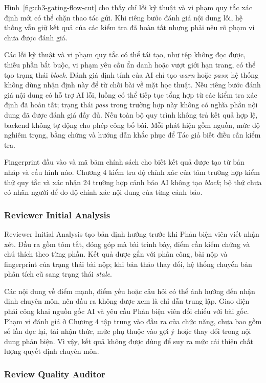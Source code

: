 Hình~\ref{fig:ch3-gating-flow-cut} cho thấy chỉ lỗi kỹ thuật và vi phạm quy tắc xác định mới có thể chặn thao tác gửi. Khi riêng bước đánh giá nội dung lỗi, hệ thống vẫn giữ kết quả của các kiểm tra đã hoàn tất nhưng phải nêu rõ phạm vi chưa được đánh giá.

Các lỗi kỹ thuật và vi phạm quy tắc có thể tái tạo, như tệp không đọc được, thiếu phần bắt buộc, vi phạm yêu cầu ẩn danh hoặc vượt giới hạn trang, có thể tạo trạng thái \textit{block}. Đánh giá định tính của AI chỉ tạo \textit{warn} hoặc \textit{pass}; hệ thống không dùng nhận định này để từ chối bài về mặt học thuật. Nếu riêng bước đánh giá nội dung có hỗ trợ AI lỗi, luồng có thể tiếp tục tổng hợp từ các kiểm tra xác định đã hoàn tất; trạng thái \textit{pass} trong trường hợp này không có nghĩa phần nội dung đã được đánh giá đầy đủ. Nếu toàn bộ quy trình không trả kết quả hợp lệ, backend không tự động cho phép công bố bài. Mỗi phát hiện gồm nguồn, mức độ nghiêm trọng, bằng chứng và hướng dẫn khắc phục để Tác giả biết điều cần kiểm tra.

Fingerprint đầu vào và mã băm chính sách cho biết kết quả được tạo từ bản nháp và cấu hình nào. Chương 4 kiểm tra độ chính xác của tám trường hợp kiểm thử quy tắc và xác nhận 24 trường hợp cảnh báo AI không tạo \textit{block}; bộ thử chưa có nhãn người để đo độ chính xác nội dung của từng cảnh báo.

\subsubsection{Reviewer Initial Analysis}

Reviewer Initial Analysis tạo bản định hướng trước khi Phản biện viên viết nhận xét. Đầu ra gồm tóm tắt, đóng góp mà bài trình bày, điểm cần kiểm chứng và chú thích theo từng phần. Kết quả được gắn với phân công, bài nộp và fingerprint của trạng thái bài nộp; khi bản thảo thay đổi, hệ thống chuyển bản phân tích cũ sang trạng thái \textit{stale}.

Các nội dung về điểm mạnh, điểm yếu hoặc câu hỏi có thể ảnh hưởng đến nhận định chuyên môn, nên đầu ra không được xem là chỉ dẫn trung lập. Giao diện phải công khai nguồn gốc AI và yêu cầu Phản biện viên đối chiếu với bài gốc. Phạm vi đánh giá ở Chương 4 tập trung vào đầu ra của chức năng, chưa bao gồm số lần đọc lại, tải nhận thức, mức phụ thuộc vào gợi ý hoặc thay đổi trong nội dung phản biện. Vì vậy, kết quả không được dùng để suy ra mức cải thiện chất lượng quyết định chuyên môn.

\subsubsection{Review Quality Auditor}

